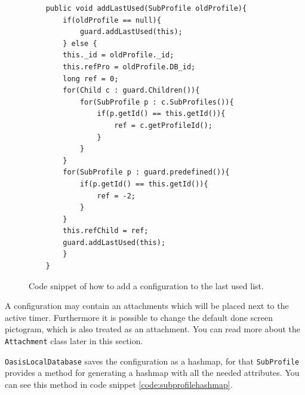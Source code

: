 \begin{description}
\begin{figure}[H]
\begin{lstlisting}
	public void addLastUsed(SubProfile oldProfile){
		if(oldProfile == null){
			guard.addLastUsed(this);
		} else {
		this._id = oldProfile._id;
		this.refPro = oldProfile.DB_id;
		long ref = 0;
		for(Child c : guard.Children()){
			for(SubProfile p : c.SubProfiles()){
				if(p.getId() == this.getId()){
					ref = c.getProfileId();
				}
			}
		}
		for(SubProfile p : guard.predefined()){
			if(p.getId() == this.getId()){
				ref = -2;
			}
		}
		this.refChild = ref;
		guard.addLastUsed(this);
		}
	}
\end{lstlisting}
\caption{Code snippet of how to add a configuration to the last used list.}%
\label{code:addlastused}%
\end{figure}
	
	A configuration may contain an attachments which will be placed next to the active timer. Furthermore it is possible to change the default done screen pictogram, which is also treated as an attachment. You can read more about the \texttt{Attachment} class later in this section.
	
	\texttt{OasisLocalDatabase} saves the configuration as a hashmap, for that \texttt{SubProfile} provides a method for generating a hashmap with all the needed attributes. You can see this method in code snippet \ref{code:subprofilehashmap}.
	

\end{description}
